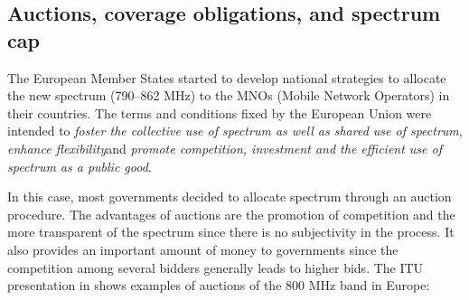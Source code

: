\subsection*{Auctions, coverage obligations, and spectrum cap}
The European Member States started to develop national strategies to allocate the new spectrum (790–862 MHz) to the MNOs (Mobile Network Operators) in their countries. The terms and conditions fixed by the European Union were intended to \guillemotleft \textit{foster the collective use of spectrum as well as shared use of spectrum}\guillemotright , \guillemotleft \textit{enhance flexibility}\guillemotright  and \guillemotleft \textit{promote competition, investment and the efficient use of spectrum as a public good}\guillemotright  \cite{1-06}.\par

In this case, most governments decided to allocate spectrum through an auction procedure. The advantages of auctions are the promotion of competition and the more transparent of the spectrum since there is no subjectivity in the process. It also provides an important amount of money to governments since the competition among several bidders generally leads to higher bids. The ITU presentation in \cite{1-08} shows examples of auctions of the 800 MHz band in Europe:


